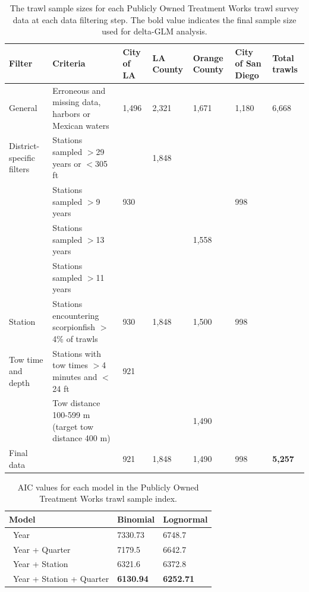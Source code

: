 \documentclass[12pt,]{article}
\begin{document}
\begin{table}[ht]
\centering
\caption{The trawl sample sizes for each
                                          Publicly Owned Treatment Works 
                                          trawl survey data at each data filtering step.  
                                          The bold value indicates the final sample size 
                                          used for delta-GLM analysis.} 
\label{tab:Fleet7_Sanitation_filter}
\begin{tabular}{>{\raggedright}p{.8in}>{\raggedright}p{2in}>{\raggedright}p{.6in}>{\raggedright}p{.6in}>{\raggedright}p{.6in}>{\raggedright}p{.8in}>{\raggedright}p{.6in}}
  \hline
Filter & Criteria & City of LA & LA County & Orange County & City of San Diego & Total trawls \\ 
  \hline
General & Erroneous and missing data, harbors or Mexican waters & 1,496 & 2,321 & 1,671 & 1,180 & 6,668 \\ 
  District-specific filters & Stations sampled $>$29 years or $<$305 ft &  & 1,848 &  &  &  \\ 
   & Stations sampled $>$9 years & 930 &  &  & 998 &  \\ 
   & Stations sampled $>$13 years &  &  & 1,558 &  &  \\ 
   & Stations sampled $>$11 years &  &  &  &  &  \\ 
  Station & Stations encountering scorpionfish $>$4\% of trawls & 930 & 1,848 & 1,500 & 998 &  \\ 
  Tow time and depth & Stations with tow times $>$4 minutes and $<$24 ft & 921 &  &  &  &  \\ 
   & Tow distance 100-599 m (target tow distance 400 m) &  &  & 1,490 &  &  \\ 
  Final data &  & 921 & 1,848 & 1,490 & 998 & \textbf{5,257} \\ 
   \hline
\end{tabular}
\end{table}\vspace{2in}

\begin{table}[ht]
\centering
\caption{AIC values for each model in the
                                         Publicly Owned Treatment Works trawl sample 
                                          index.} 
\label{tab:Fleet7_Sanitation_aic}
\begin{tabular}{lll}
  \hline
Model & Binomial & Lognormal \\ 
  \hline
~Year & 7330.73 & 6748.7 \\ 
  ~Year + Quarter & 7179.5 & 6642.7 \\ 
  ~Year + Station & 6321.6 & 6372.8 \\ 
  ~Year + Station + Quarter & \textbf{6130.94} & \textbf{6252.71} \\ 
   \hline
\end{tabular}
\end{table}\vspace{2in}
\end{document}
